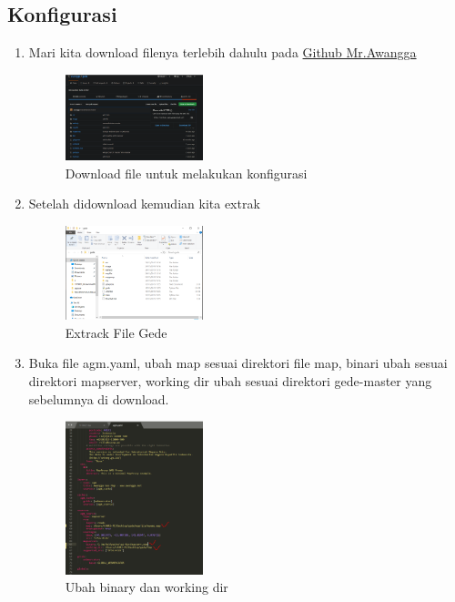 \subsection{Konfigurasi}
\begin{enumerate}
    \item Mari kita download filenya terlebih dahulu pada \href{https://github.com/awangga/gede}{Github Mr.Awangga}
    \hfill\break
    \begin{figure}[H]
		\includegraphics[width=4cm]{figures/1174021/5/2.png}
		\centering
		\caption{Download file untuk melakukan konfigurasi}
    \end{figure}

    \item Setelah didownload kemudian kita extrak
    \hfill\break
    \begin{figure}[H]
		\includegraphics[width=4cm]{figures/1174021/5/3.png}
		\centering
		\caption{Extrack File Gede}
    \end{figure}

    \item Buka file agm.yaml, ubah map sesuai direktori file map, binari ubah sesuai direktori mapserver, working dir ubah sesuai direktori gede-master yang sebelumnya di download.
    \hfill\break
    \begin{figure}[H]
		\includegraphics[width=4cm]{figures/1174021/5/4.png}
		\centering
		\caption{Ubah binary dan working dir}
    \end{figure}


\end{enumerate}
